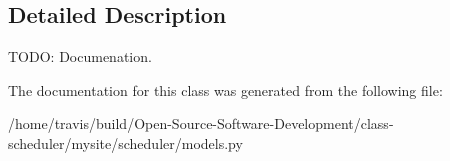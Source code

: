 \subsection{Detailed Description}
T\-O\-D\-O\-: Documenation. 

The documentation for this class was generated from the following file\-:\begin{DoxyCompactItemize}
\item 
/home/travis/build/\-Open-\/\-Source-\/\-Software-\/\-Development/class-\/scheduler/mysite/scheduler/models.\-py\end{DoxyCompactItemize}
